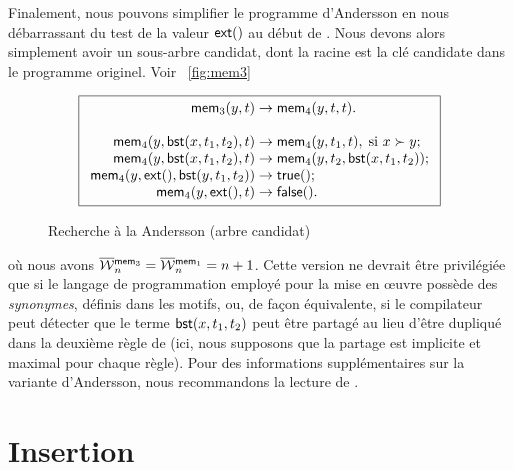 Finalement, nous pouvons simplifier le programme d'Andersson en nous
débarrassant du test de la valeur \(\textsf{ext}()\) au début de
. Nous devons alors
simplement avoir un sous-arbre candidat, dont la racine est la clé
candidate dans le programme originel. Voir \fig~\vref{fig:mem3}
\begin{figure}
\begin{equation*}
\boxed{
\begin{array}{r@{\;}l@{\;}l}
  \fun{mem}_3(y,t) & \rightarrow & \fun{mem}_4(y,t,t).\\
  \\
  \fun{mem}_4(y,\fun{bst}(x,t_1,t_2),t) & \rightarrow &
  \fun{mem}_4(y,t_1,t),\; \text{si \(x \succ y\)};\\
\fun{mem}_4(y,\fun{bst}(x,t_1,t_2),t) & \rightarrow &
  \fun{mem}_4(y,t_2,\fun{bst}(x,t_1,t_2));\\
\fun{mem}_4(y,\fun{ext}(),\fun{bst}(y,t_1,t_2)) & \rightarrow & \fun{true}();\\
\fun{mem}_4(y,\fun{ext}(),t) & \rightarrow & \fun{false}().
\end{array}}
\end{equation*}
\caption{Recherche à la Andersson (arbre candidat)\label{fig:mem3}}
\end{figure}
où nous avons \(\OW{\fun{mem}_3}{n} = \OW{\fun{mem}_1}{n} = n + 1\).
Cette version ne devrait être privilégiée que si le langage de
programmation employé pour la mise en {\oe}uvre possède des
\emph{synonymes}, définis dans les motifs, ou,
de façon équivalente, si le compilateur peut détecter que le terme
\(\textsf{bst}(x,t_1,t_2)\) peut être partagé au lieu d'être dupliqué
dans la deuxième règle de  (ici, nous supposons que
la partage est implicite et maximal pour chaque
règle). Pour des informations
supplémentaires sur la variante d'Andersson, nous recommandons la
lecture de \cite{Spuler_1992}.


\section{Insertion}
\label{sec:bst_insertion}


